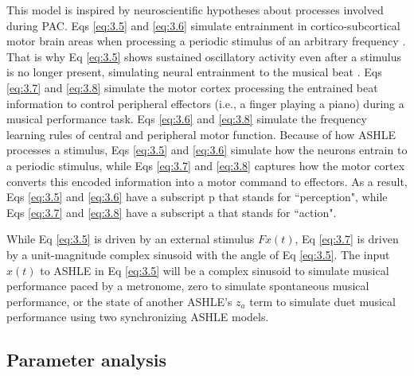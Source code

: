 \documentclass{report}
\begin{document}
This model is inspired by neuroscientific hypotheses about processes involved during PAC. Eqs \eqref{eq:3.5} and \eqref{eq:3.6} simulate entrainment in cortico-subcortical motor brain areas when processing a periodic stimulus of an arbitrary frequency \cite{daly2014changes, grahn2009feeling, grahn2013finding}. That is why Eq \eqref{eq:3.5} shows sustained oscillatory activity even after a stimulus is no longer present, simulating neural entrainment to the musical beat \cite{large2015neural}. Eqs \eqref{eq:3.7} and \eqref{eq:3.8} simulate the motor cortex processing the entrained beat information to control peripheral effectors (i.e., a finger playing a piano) during a musical performance task. Eqs \eqref{eq:3.6} and \eqref{eq:3.8} simulate the frequency learning rules of central and peripheral motor function. Because of how ASHLE processes a stimulus, Eqs \eqref{eq:3.5} and \eqref{eq:3.6} simulate how the neurons entrain to a periodic stimulus, while Eqs \eqref{eq:3.7} and \eqref{eq:3.8} captures how the motor cortex converts this encoded information into a motor command to effectors. As a result, Eqs \eqref{eq:3.5} and \eqref{eq:3.6} have a subscript p that stands for ``perception", while Eqs \eqref{eq:3.7} and \eqref{eq:3.8} have a subscript a that stands for ``action".

While Eq \eqref{eq:3.5} is driven by an external stimulus $Fx(t)$, Eq \eqref{eq:3.7} is driven by a unit-magnitude complex sinusoid with the angle of Eq \eqref{eq:3.5}. The input $x(t)$ to ASHLE in Eq \eqref{eq:3.5} will be a complex sinusoid to simulate musical performance paced by a metronome, zero to simulate spontaneous musical performance, or the state of another ASHLE's $z_a$ term to simulate duet musical performance using two synchronizing ASHLE models.

\subsection{Parameter analysis}
\end{document}
